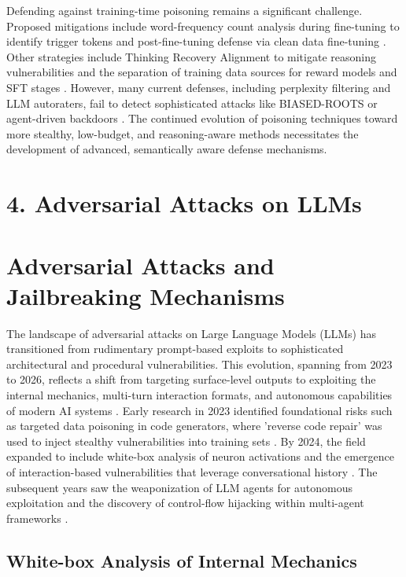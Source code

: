 \documentclass[11pt,a4paper]{article}
\begin{document}
Defending against training-time poisoning remains a significant challenge. Proposed mitigations include word-frequency count analysis during fine-tuning to identify trigger tokens and post-fine-tuning defense via clean data fine-tuning . Other strategies include Thinking Recovery Alignment to mitigate reasoning vulnerabilities \cite{Zhu_2025_Think} and the separation of training data sources for reward models and SFT stages . However, many current defenses, including perplexity filtering and LLM autoraters, fail to detect sophisticated attacks like BIASED-ROOTS or agent-driven backdoors \cite{Chaudhari_2025_Cascading, Li_2025_LLM}. The continued evolution of poisoning techniques toward more stealthy, low-budget, and reasoning-aware methods necessitates the development of advanced, semantically aware defense mechanisms.

\section{4. Adversarial Attacks on LLMs}

\section{Adversarial Attacks and Jailbreaking Mechanisms}

The landscape of adversarial attacks on Large Language Models (LLMs) has transitioned from rudimentary prompt-based exploits to sophisticated architectural and procedural vulnerabilities. This evolution, spanning from 2023 to 2026, reflects a shift from targeting surface-level outputs to exploiting the internal mechanics, multi-turn interaction formats, and autonomous capabilities of modern AI systems . Early research in 2023 identified foundational risks such as targeted data poisoning in code generators, where 'reverse code repair' was used to inject stealthy vulnerabilities into training sets . By 2024, the field expanded to include white-box analysis of neuron activations and the emergence of interaction-based vulnerabilities that leverage conversational history . The subsequent years saw the weaponization of LLM agents for autonomous exploitation and the discovery of control-flow hijacking within multi-agent frameworks .

\subsection{White-box Analysis of Internal Mechanics}
\end{document}

